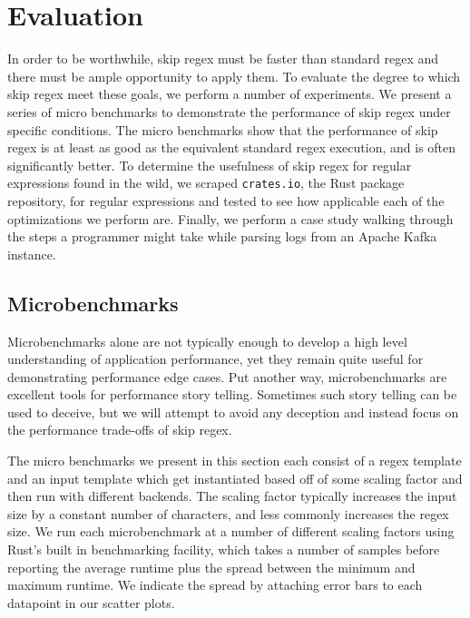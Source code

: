 \chapter{Evaluation}
\label{chapter:evaluation}

In order to be worthwhile, skip regex must be faster than standard
regex and there must be ample opportunity to apply them. To evaluate
the degree to which skip regex meet these goals, we perform a number
of experiments.  We present a series of micro benchmarks to demonstrate
the performance of skip regex under specific conditions. The micro
benchmarks show that the performance of skip regex is
at least as good as the equivalent standard regex execution, and 
is often significantly better. To determine the usefulness of skip
regex for regular expressions found in the wild, we scraped
\verb'crates.io', the Rust package repository,
for regular expressions and tested to see how applicable each of the 
optimizations we perform are. Finally, we perform a case study walking
through the steps a programmer might take while parsing logs from
an Apache Kafka instance.

\section{Microbenchmarks}

Microbenchmarks alone are not typically enough to develop a high
level understanding of application performance, yet they remain
quite useful for demonstrating performance edge cases. Put another
way, microbenchmarks are excellent tools for performance story
telling. Sometimes such story telling can be used to deceive,
but we will attempt to avoid any deception and instead focus
on the performance trade-offs of skip regex.

The micro benchmarks we present in this section each consist of
a regex template and an input template which get instantiated
based off of some scaling factor and then run with different
backends. The scaling factor typically increases the input
size by a constant number of characters, and less commonly
increases the regex size. We run each microbenchmark at a
number of different scaling factors using Rust's built in
benchmarking facility, which takes a number of samples before
reporting the average runtime plus the spread between the minimum
and maximum runtime. We indicate the spread by attaching error bars to
each datapoint in our scatter plots.

